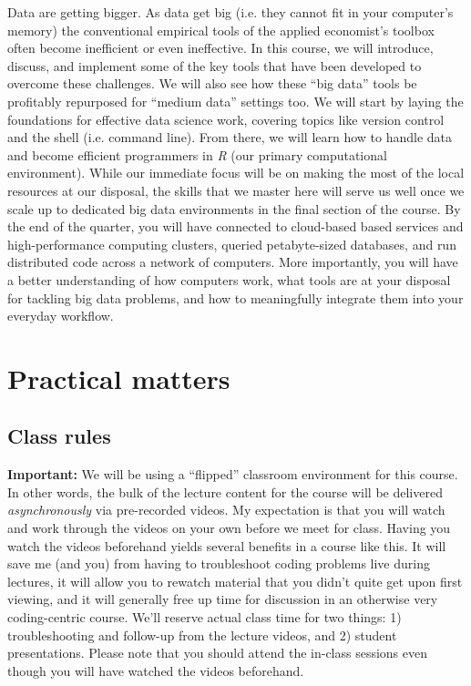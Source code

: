 \documentclass[12]{article}
\begin{document}
Data are getting bigger. As data get big (i.e. they cannot fit in your
computer's memory) the conventional empirical tools of the applied economist's
toolbox often become inefficient or even ineffective. 
In this course, we will introduce, discuss, and implement some of the
key tools that have been developed to overcome these challenges. We will also
see how these ``big data'' tools be profitably repurposed for ``medium data''
settings too.  We will start by laying the foundations for effective data
science work, covering topics like version control and the shell (i.e. command
line). From there, we will learn how to handle data and become efficient
programmers in \textit{R} (our primary computational environment). While our
immediate focus will be on making the most of the local resources at our
disposal, the skills that we master here will serve us well once we scale up to
dedicated big data environments in the final section of the course. By the end
of the quarter, you will have connected to cloud-based based services and
high-performance computing clusters, queried petabyte-sized databases, and run
distributed code across a network of computers. More importantly, you will have
a better understanding of how computers work, what tools are at your disposal
for tackling big data problems, and how to meaningfully integrate them into your
everyday workflow.

\section*{Practical matters}

\subsection*{Class rules}

\textbf{Important:} We will be using a ``flipped'' classroom environment for
this course. In other words, the bulk of the lecture content for the course will
be delivered \textit{asynchronously} via pre-recorded videos. My expectation is
that you will watch and work through the videos on your own before we meet for
class. Having you watch the videos beforehand yields several benefits in a
course like this. It will save me (and you) from having to troubleshoot coding
problems live during lectures, it will allow you to rewatch material that you
didn't quite get upon first viewing, and it will generally free up time for
discussion in an otherwise very coding-centric course. We'll reserve actual
class time for two things: 1) troubleshooting and follow-up from the lecture 
videos, and 2) student presentations. Please note that you should attend the 
in-class sessions even though you will have watched the videos beforehand.
\end{document}
